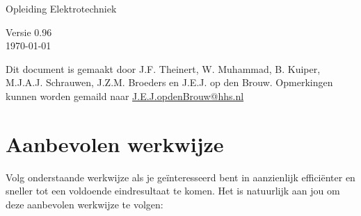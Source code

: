 \documentclass[a4paper,10pt,fleqn,twoside]{article}
\def\version{0.96}
\newif\ifprintdifficulty
\begin{document}
\begin{titlepage}
\vspace*{2cm}
\Large Opleiding Elektrotechniek\\

\vspace*{1cm}

\Large Versie \version\\ \today

\ifprintdifficulty
\vspace*{1cm}
\textcolor{red}{\fbox{Docentenexemplaar}}
\fi
\vfill
\end{titlepage}



\tableofcontents

\vfill
Dit document is gemaakt door J.F. Theinert, W. Muhammad, B. Kuiper, M.J.A.J. Schrauwen, J.Z.M. Broeders en J.E.J. op den Brouw.
Opmerkingen kunnen worden gemaild naar \href{mailto:J.E.J.opdenBrouw@hhs.nl}{J.E.J.opdenBrouw@hhs.nl}


\clearpage
\section*{Aanbevolen werkwijze}

Volg onderstaande werkwijze als je geïnteresseerd bent in aanzienlijk efficiënter en sneller tot een voldoende eindresultaat te komen. Het is natuurlijk aan jou om deze aanbevolen werkwijze te volgen:
\end{document}
